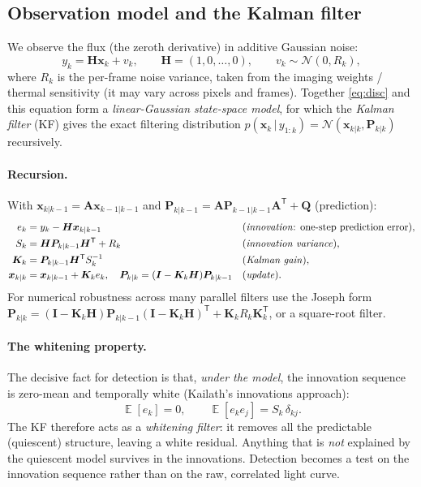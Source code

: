 \documentclass[11pt]{article}
\DeclareMathOperator{\E}{\mathbb{E}}
\newcommand{\Norm}{\mathcal{N}}
\newcommand{\T}{^{\mathsf{T}}}
\newcommand{\given}{\,|\,}
\begin{document}
\subsection{Observation model and the Kalman filter}
\label{sec:kf}

We observe the flux (the zeroth derivative) in additive Gaussian noise:
\begin{equation}
  y_k = \bm{H}\bm{x}_k + v_k, \qquad \bm{H}=(1,0,\dots,0),\qquad v_k\sim\Norm(0,R_k),
\end{equation}
where $R_k$ is the per-frame noise variance, taken from the imaging weights / thermal
sensitivity (it may vary across pixels and frames). Together
\eqref{eq:disc} and this equation form a \emph{linear-Gaussian state-space model}, for
which the \emph{Kalman filter} (KF) gives the exact filtering distribution
$p(\bm{x}_k\given y_{1:k})=\Norm(\bm{x}_{k|k},\bm{P}_{k|k})$ recursively.

\paragraph{Recursion.} With $\bm{x}_{k|k-1}=\bm{A}\bm{x}_{k-1|k-1}$ and
$\bm{P}_{k|k-1}=\bm{A}\bm{P}_{k-1|k-1}\bm{A}\T+\bm{Q}$ (prediction):
\begin{align}
  e_k &= y_k - \bm{H}\bm{x}_{k|k-1}
      &&\text{(\emph{innovation}: one-step prediction error)},\\
  S_k &= \bm{H}\bm{P}_{k|k-1}\bm{H}\T + R_k
      &&\text{(\emph{innovation variance})},\\
  \bm{K}_k &= \bm{P}_{k|k-1}\bm{H}\T S_k^{-1}
      &&\text{(\emph{Kalman gain})},\\
  \bm{x}_{k|k} &= \bm{x}_{k|k-1} + \bm{K}_k e_k, \quad
  \bm{P}_{k|k} = (\bm{I}-\bm{K}_k\bm{H})\bm{P}_{k|k-1}
      &&\text{(\emph{update})}.
\end{align}
For numerical robustness across many parallel filters use the Joseph form
$\bm{P}_{k|k}=(\bm{I}-\bm{K}_k\bm{H})\bm{P}_{k|k-1}(\bm{I}-\bm{K}_k\bm{H})\T+\bm{K}_k R_k\bm{K}_k\T$,
or a square-root filter.

\paragraph{The whitening property.}
The decisive fact for detection is that, \emph{under the model}, the innovation
sequence is zero-mean and temporally white (Kailath's innovations approach):
\begin{equation}
  \E[e_k]=0,\qquad \E[e_k e_j] = S_k\,\delta_{kj}.
  \label{eq:white}
\end{equation}
The KF therefore acts as a \emph{whitening filter}: it removes all the predictable
(quiescent) structure, leaving a white residual. Anything that is \emph{not} explained
by the quiescent model survives in the innovations. Detection becomes a test on the
innovation sequence rather than on the raw, correlated light curve.
\end{document}

